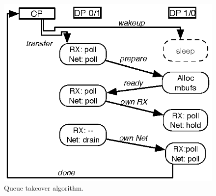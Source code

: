 \begin{figure}
\begin{centering}
\includegraphics{figs/queue-takeover.eps}
\caption{Queue takeover algorithm.}
\label{fig:queue-takeover}
\end{centering}
\end{figure}

